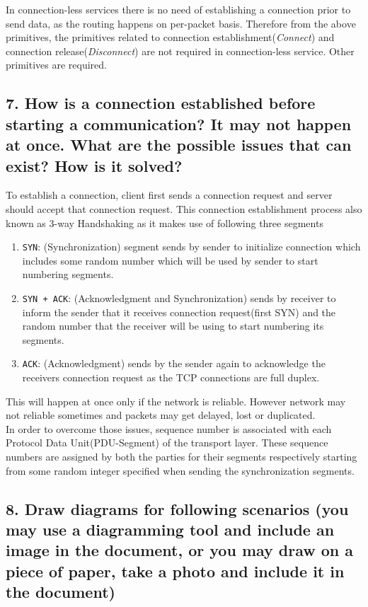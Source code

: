 \documentclass[a4paper,11pt]{article}
\begin{document}
In connection-less services there is no need of establishing a connection prior to send data, as the routing happens on per-packet basis. Therefore from the above primitives, the primitives related to connection establishment({\textit{Connect}}) and connection release({\textit{Disconnect}})  are not required in connection-less service. Other primitives are required.

\subsection*{7. How is a connection established before starting a communication? It may not happen at once. What are the possible issues that can exist? How is it solved?}

To establish a connection, client first sends a connection request and server should accept that connection request. This connection establishment process also known as 3-way Handshaking as it makes use of following three segments
\begin{enumerate}
	\item {\tt SYN}: (Synchronization) segment sends by sender to initialize connection which includes some random number which will be used by sender to start numbering segments.
	\item {\tt SYN + ACK}: (Acknowledgment and Synchronization)  sends by receiver to inform the sender that it receives connection request(first SYN) and the random number that the receiver will be using to start numbering its segments.
	\item {\tt ACK}: (Acknowledgment) sends by the sender again to acknowledge the receivers connection request as the TCP connections are full duplex.
\end{enumerate}

This will happen at once only if the network is reliable. However network may not reliable sometimes and packets may get delayed, lost or duplicated.\\

In order to overcome those issues, sequence number is associated with each Protocol Data Unit(PDU-Segment) of the transport layer. These sequence numbers are assigned by both the parties for their segments respectively starting from some random integer specified when sending the synchronization segments.

\subsection*{8. Draw diagrams for following scenarios (you may use a diagramming tool and include an image in the document, or you may draw on a piece of paper, take a photo and include it in the document)}
\end{document}
